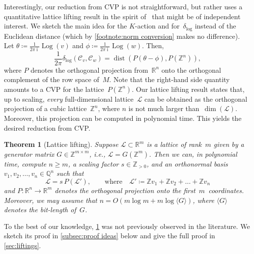 \documentclass[10pt,a4paper]{article}
\newtheorem{theorem}{Theorem}[section]
\theoremstyle{definition}
\DeclareMathOperator{\ii}{i}
\DeclareMathOperator{\Log}{Log}
\DeclareMathOperator{\dist}{dist}
\newcommand{\distLD}{\delta_{\log}}
\newcommand{\QQ}{\mathbb{Q}}
\newcommand{\ZZ}{\mathbb{Z}}
\newcommand{\RR}{\mathbb{R}}
\newcommand{\KK}{\ensuremath{\mathcal{C}}}
\numberwithin{equation}{section}
\begin{document}
Interestingly, our reduction from CVP is not straightforward,
but rather uses a quantitative lattice lifting result
in the spirit of~\cite{conway-sloane} that might be of independent interest.
We sketch the main idea for the $K$-action and for~$\distLD$ instead of the Euclidean distance
(which by \cref{footnote:norm conversion} makes no difference).
Let $\theta \coloneqq \frac1{2\pi\ii} \Log(v)$ and $\phi\coloneqq \frac1{2\pi\ii} \Log(w)$.
Then,
\begin{equation}
\label{eq:distLD-to-CVP}
  \frac1{2\pi} \distLD(\KK_v, \KK_w)
 = \dist(P(\theta - \phi), P(\ZZ^n)),
\end{equation}
where $P$ denotes the orthogonal projection from~$\RR^n$ onto the orthogonal complement of the row space of~$M$.
Note that the right-hand side quantity amounts to a CVP for the lattice~$P(\ZZ^n)$.
Our lattice lifting result states that, up to scaling, \emph{every} full-dimensional lattice~$\mathcal L$
can be obtained as the orthogonal projection of a cubic lattice~$\ZZ^n$, where $n$ is not much larger than~$\dim(\mathcal L)$.
Moreover, this projection can be computed in polynomial time.
This yields the desired reduction from CVP.

\begin{theorem}[Lattice lifting]\label{thm:intro lattice lifting}
Suppose $\mathcal{L} \subset \RR^m$ is a lattice of rank~$m$ given by a generator matrix $G\in\ZZ^{m\times m}$,
i.e., $\mathcal{L} = G(\ZZ^m)$.
Then we can, in polynomial time, compute $n\geq m$, a scaling factor $s\in\ZZ_{>0}$,
and an orthonormal basis~$v_1,v_2,\dots,v_n\in\QQ^n$ such that
\[
    \mathcal{L} = s\, P(\mathcal{L}'),\qquad \text{where}\quad \mathcal{L}'\coloneqq \ZZ v_1 +\ZZ v_2+\dots+\ZZ v_n
\]
and
$P \colon \RR^n\rightarrow\RR^m$ denotes the orthogonal projection onto the first~$m$~coordinates.
Moreover, we may assume that $n = O(m\log m + m \log\langle G\rangle)$,
where $\langle G\rangle$ denotes the bit-length of~$G$.
\end{theorem}

To the best of our knowledge, \cref{thm:intro lattice lifting} was not previously observed in the literature.
We sketch its proof in \cref{subsec:proof ideas} below and give the full proof in \cref{sec:liftings}.

\end{document}
